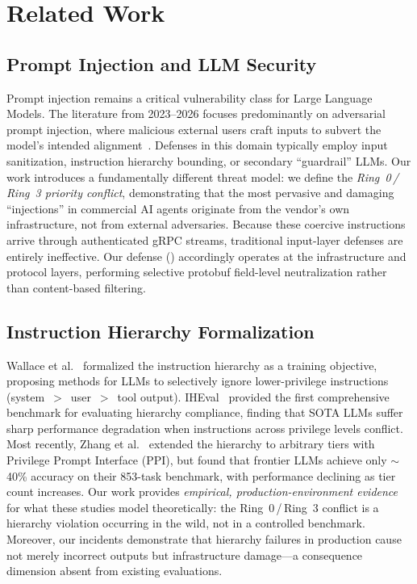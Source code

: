 \section{Related Work}
\label{sec:related}

\subsection{Prompt Injection and LLM Security}
Prompt injection remains a critical vulnerability class for Large Language Models. The literature from 2023--2026 focuses predominantly on adversarial prompt injection, where malicious external users craft inputs to subvert the model's intended alignment~\cite{perez2022ignore, greshake2023not, liu2024formalizing}. Defenses in this domain typically employ input sanitization, instruction hierarchy bounding, or secondary ``guardrail'' LLMs. Our work introduces a fundamentally different threat model: we define the \emph{Ring~0\,/\,Ring~3 priority conflict}, demonstrating that the most pervasive and damaging ``injections'' in commercial AI agents originate from the vendor's own infrastructure, not from external adversaries. Because these coercive instructions arrive through authenticated gRPC streams, traditional input-layer defenses are entirely ineffective. Our defense (\stls{}) accordingly operates at the infrastructure and protocol layers, performing selective protobuf field-level neutralization rather than content-based filtering.

\subsection{Instruction Hierarchy Formalization}
Wallace et al.~\cite{wallace2024instruction} formalized the instruction hierarchy as a training objective, proposing methods for LLMs to selectively ignore lower-privilege instructions (system~$>$~user~$>$~tool output). IHEval~\cite{zhang2025iheval} provided the first comprehensive benchmark for evaluating hierarchy compliance, finding that SOTA LLMs suffer sharp performance degradation when instructions across privilege levels conflict. Most recently, Zhang et al.~\cite{zhang2026manyih} extended the hierarchy to arbitrary tiers with Privilege Prompt Interface (PPI), but found that frontier LLMs achieve only $\sim$40\% accuracy on their 853-task benchmark, with performance declining as tier count increases. Our work provides \emph{empirical, production-environment evidence} for what these studies model theoretically: the Ring~0\,/\,Ring~3 conflict is a hierarchy violation occurring in the wild, not in a controlled benchmark. Moreover, our incidents demonstrate that hierarchy failures in production cause not merely incorrect outputs but infrastructure damage---a consequence dimension absent from existing evaluations.

